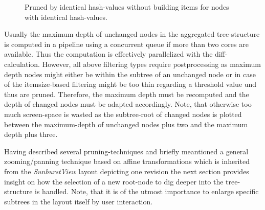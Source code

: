 \begin{itemize}
\begin{figure}[tb]
\caption{\label{fig:pruned-by-hash-without-samehashes} Pruned by identical hash-values without building items for nodes with identical hash-values.}
\end{figure}
\end{itemize}

Usually the maximum depth of unchanged nodes in the aggregated tree-structure is computed in a pipeline using a concurrent queue if more than two cores are available. Thus the computation is effectively parallelized with the diff-calculation. However, all above filtering types require postprocessing as maximum depth nodes might either be within the subtree of an unchanged node or in case of the itemsize-based filtering might be too thin regarding a threshold value und thus are pruned. Therefore, the maximum depth must be recomputed and the depth of changed nodes must be adapted accordingly. Note, that otherwise too much screen-space is wasted as the subtree-root of changed nodes is plotted between the maximum-depth of unchanged nodes plus two and the maximum depth plus three.

Having described several pruning-techniques and briefly meantioned a general zooming/panning technique based on affine transformations which is inherited from the \emph{SunburstView} layout depicting one revision the next section provides insight on how the selection of a new root-node to dig deeper into the tree-structure is handled. Note, that it is of the utmost importance to enlarge specific subtrees in the layout itself by user interaction. 

